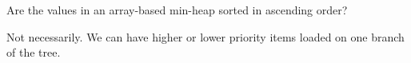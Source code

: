 \question Are the values in an array-based min-heap sorted in ascending order?

\begin{solution}[0.25in]
Not necessarily. We can have higher or lower priority items loaded on one branch of the tree.
\end{solution}